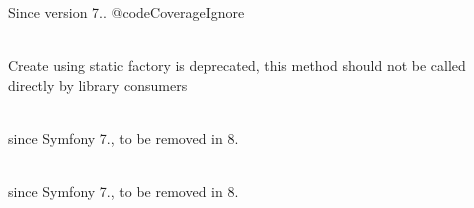 \begin{DoxyRefList}
%
Since version 7.. @code\+Coverage\+Ignore  
\item[Global \doxylink{classphp_documentor_1_1_reflection_1_1_doc_block_1_1_tags_1_1_extends___a6fafdaff738bff5d477ed4a6b97253fe}{Extends\+\_\+\+::create} (string \$body)]\hfill \\
\label{deprecated__deprecated000273}%
%
Create using static factory is deprecated, this method should not be called directly by library consumers  
\item[Global \doxylink{class_symfony_1_1_component_1_1_http_kernel_1_1_dependency_injection_1_1_extension_a30b6e95920088bacb50349ac2e3e13aa}{Extension\+::add\+Annotated\+Classes\+To\+Compile} (array \$annotated\+Classes)]\hfill \\
\label{deprecated__deprecated000434}%
%
since Symfony 7., to be removed in 8.  
\item[Global \doxylink{class_symfony_1_1_component_1_1_http_kernel_1_1_dependency_injection_1_1_extension_adcbb9d47e10094a280f0d61c65c81ffd}{Extension\+::get\+Annotated\+Classes\+To\+Compile} ()]\hfill \\
\label{deprecated__deprecated000433}%
%
since Symfony 7., to be removed in 8.  
\item[Class \doxylink{class_carbon_1_1_factory}{Factory} ]\hfill \\
\label{deprecated__deprecated000207}%
%

\end{DoxyRefList}

